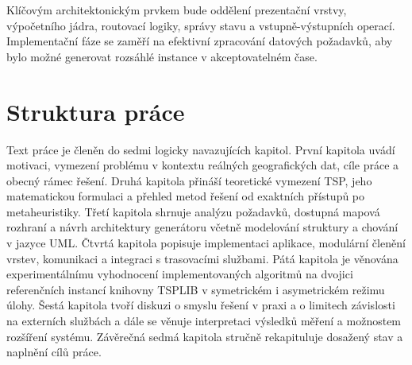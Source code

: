 Klíčovým architektonickým prvkem bude oddělení prezentační vrstvy, výpočetního jádra, routovací logiky, správy stavu a vstupně-výstupních operací. Implementační fáze se zaměří na efektivní zpracování datových požadavků, aby bylo možné generovat rozsáhlé instance v akceptovatelném čase.

\section{Struktura práce}

Text práce je členěn do sedmi logicky navazujících kapitol.
První kapitola uvádí motivaci, vymezení problému v kontextu reálných geografických dat, cíle práce a obecný rámec řešení.
Druhá kapitola přináší teoretické vymezení TSP, jeho matematickou formulaci a přehled metod řešení od exaktních přístupů po metaheuristiky.
Třetí kapitola shrnuje analýzu požadavků, dostupná mapová rozhraní a návrh architektury generátoru včetně modelování struktury a chování v jazyce UML.
Čtvrtá kapitola popisuje implementaci aplikace, modulární členění vrstev, komunikaci a integraci s trasovacími službami.
Pátá kapitola je věnována experimentálnímu vyhodnocení implementovaných algoritmů na dvojici referenčních instancí knihovny TSPLIB v symetrickém i asymetrickém režimu úlohy.
Šestá kapitola tvoří diskuzi o smyslu řešení v praxi a o limitech závislosti na externích službách a dále se věnuje interpretaci výsledků měření a možnostem rozšíření systému.
Závěrečná sedmá kapitola stručně rekapituluje dosažený stav a naplnění cílů práce.